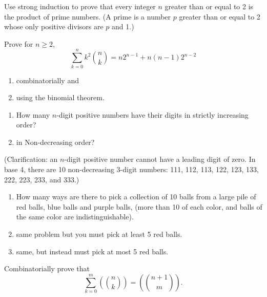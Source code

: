 \documentclass[12pt,letterpaper]{hmcpset}
\newcommand{\pn}[1]{\left(#1\right)}
\newcommand{\mc}[2]{\pn{\binom{#1}{#2}}}
\renewcommand{\b}[2]{\binom{#1}{#2}}
\begin{document}
\begin{problem}[6]
    Use strong induction to prove that every integer $n$ greater than or equal to 2 is the product of prime numbers. (A prime is a number $p$ greater than or equal to 2 whose only positive divisors are $p$ and 1.)
\end{problem}
\begin{solution}
    \vfill
\end{solution}
\newpage

\begin{problem}[7]
    Prove for $n\geq2$,
    \[
        \sum_{k=0}^nk^2\b{n}{k}=n2^{n-1}+n(n-1)2^{n-2}
    \]
    \begin{enumerate}
        \item combinatorially and
        \item using the binomial theorem.
    \end{enumerate}
\end{problem}
\begin{solution}
    \vfill
\end{solution}
\newpage

\begin{problem}[8]
    \begin{enumerate}
        \item How many $n$-digit positive numbers have their digits in strictly increasing order?
        \item in Non-decreasing order?
    \end{enumerate}
     (Clarification: an $n$-digit positive number cannot have a leading digit of zero. In base 4, there are 10 non-decreasing 3-digit numbers: 111, 112, 113, 122, 123, 133, 222, 223, 233, and 333.)
\end{problem}
\begin{solution}
    \vfill
\end{solution}
\newpage

\begin{problem}[9]
    \begin{enumerate}
        \item How many ways are there to pick a collection of 10 balls from a large pile of red balls, blue balls and purple balls, (more than 10 of each color, and balls of the same color are indistinguishable).
        \item same problem but you must pick at least 5 red balls.
        \item same, but instead must pick at most 5 red balls.
    \end{enumerate}
\end{problem}
\begin{solution}
    \vfill
\end{solution}
\newpage

\begin{problem}[10]
    Combinatorially prove that
    \[
        \sum_{k=0}^m\mc{n}{k}=\mc{n+1}{m}.
    \]
\end{problem}
\begin{solution}
    \vfill
\end{solution}
\end{document}
